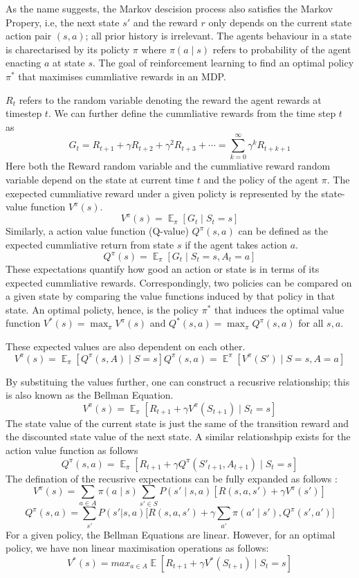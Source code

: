 \documentclass[12pt,a4paper]{report}
\DeclareMathOperator{\EX}{\mathbb{E}}
\begin{document}
As the name suggests, the Markov descision process also satisfies the Markov Propery, i.e, the next state $s'$ and the reward $r$ only depends on the current state action pair $(s, a)$; all prior history is irrelevant. The agents behaviour in a state is charectarised by its policty $\pi$ where $\pi(a \mid s)$ refers to probability of the agent enacting $a$ at state $s$. The goal of reinforcement learning to find an optimal policy $\pi^*$ that maximises cummliative rewards in an MDP.  

$R_{t}$ refers to the random variable denoting the reward the agent rewards at timestep $t$. We can further define the cummliative rewards from the time step $t$ as 
\[G_t = R_{t+1} + \gamma R_{t+2} + \gamma^2 R_{t+3} + \cdots = \sum_{k=0}^{\infty} \gamma^k R_{t+k+1}\]
Here both the Reward random variable and the cummliative reward random variable depend on the state at current time $t$ and the policy of the agent $\pi$. The exepected cummliative reward under a given policty is represented by the state-value function $V^{\pi}(s)$. 
\[
  V^{\pi}(s) = \EX_{\pi}[G_t \mid S_t = s]
\]
Similarly, a action value function (Q-value) $Q^\pi (s, a)$ can be defined as the expected cummliative return from state $s$ if the agent takes action $a$. 
 \[
  Q^{\pi}(s) = \EX_{\pi}[G_t \mid S_t = s, A_t = a]
\]
These expectations quantify how good an action or state is in terms of its expected cummliative rewards. Correspondingly, two policies can be compared on a given state by comparing the value functions induced by that policy in that state. An optimal policty, hence, is the policy $\pi^*$ that induces the optimal value function $V^*(s) = \max_\pi V^\pi(s)$ and $Q^*(s, a) = \max_\pi Q^\pi(s, a)$ for all $s, a$. \par

These expected values are also dependent on each other. 
\[
  V^\pi(s) = \EX_{\pi}[Q^\pi(s, A) \mid S = s]
  Q^\pi(s, a) = \EX^\pi[V^\pi(S') \mid S = s, A = a ]
\] 

By substituing the values further, one can construct a recusrive relationship; this is also known as the Bellman Equation.  
\[
  V^\pi(s) = \EX_{\pi}[ R_{t+1} + \gamma V^\pi(S_{t+1}) \mid S_{t}= s]
\]
The state value of the current state is just the same of the transition reward and the discounted state value of the next state. A similar relationshpip exists for the action value function as follows  
\[
  Q^\pi(s, a) = \EX_{\pi}[ R_{t+1} + \gamma Q^\pi(S'_{t+1}, A_{t+1}) \mid S_{t}= s]
\]
The defination of the recusrive expectations can be fully expanded as follows :
\[V^{\pi}(s) = \sum_{a \in A} \pi(a \mid s) \sum_{s' \in S} P(s' \mid s, a) \left[ R(s, a, s') + \gamma V^{\pi}(s') \right] \] 
\[
Q^\pi(s,a) = \sum_{s'}P(s'|s,a)\big[ R(s,a,s') + \gamma \sum_{a'}\pi(a'\mid s'),Q^\pi(s',a')\big]
\]
For a given policy, the Bellman Equations are linear. However, for an optimal policy, we have non linear maximisation operations as follows: 
\[
  V^*(s) = max_{a \in A}\EX[ R_{t+1} + \gamma V^*(S_{t+1}) \mid S_{t}= s]
\]
\end{document}
